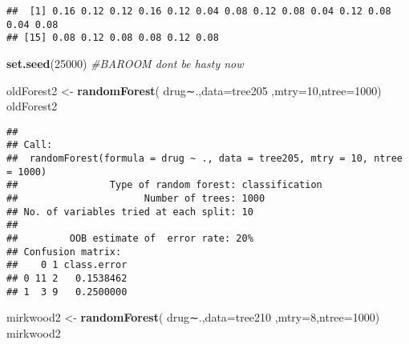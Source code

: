 \documentclass[]{article}
\newenvironment{Shaded}{\begin{snugshade}}{\end{snugshade}}
\newcommand{\KeywordTok}[1]{\textcolor[rgb]{0.13,0.29,0.53}{\textbf{#1}}}
\newcommand{\DataTypeTok}[1]{\textcolor[rgb]{0.13,0.29,0.53}{#1}}
\newcommand{\DecValTok}[1]{\textcolor[rgb]{0.00,0.00,0.81}{#1}}
\newcommand{\StringTok}[1]{\textcolor[rgb]{0.31,0.60,0.02}{#1}}
\newcommand{\CommentTok}[1]{\textcolor[rgb]{0.56,0.35,0.01}{\textit{#1}}}
\newcommand{\ControlFlowTok}[1]{\textcolor[rgb]{0.13,0.29,0.53}{\textbf{#1}}}
\newcommand{\OperatorTok}[1]{\textcolor[rgb]{0.81,0.36,0.00}{\textbf{#1}}}
\newcommand{\NormalTok}[1]{#1}
\begin{document}
\begin{Shaded}
\end{Shaded}

\begin{verbatim}
##  [1] 0.16 0.12 0.12 0.16 0.12 0.04 0.08 0.12 0.08 0.04 0.12 0.08 0.04 0.08
## [15] 0.08 0.12 0.08 0.08 0.12 0.08
\end{verbatim}

\begin{Shaded}
\begin{Highlighting}[]
\KeywordTok{set.seed}\NormalTok{(}\DecValTok{25000}\NormalTok{)}
\CommentTok{#BAROOM dont be hasty now}

\NormalTok{oldForest2 <-}\StringTok{ }\KeywordTok{randomForest}\NormalTok{( drug∼.,}\DataTypeTok{data=}\NormalTok{tree205  ,}\DataTypeTok{mtry=}\DecValTok{10}\NormalTok{,}\DataTypeTok{ntree=}\DecValTok{1000}\NormalTok{)}
\NormalTok{oldForest2}
\end{Highlighting}
\end{Shaded}

\begin{verbatim}
## 
## Call:
##  randomForest(formula = drug ~ ., data = tree205, mtry = 10, ntree = 1000) 
##                Type of random forest: classification
##                      Number of trees: 1000
## No. of variables tried at each split: 10
## 
##         OOB estimate of  error rate: 20%
## Confusion matrix:
##    0 1 class.error
## 0 11 2   0.1538462
## 1  3 9   0.2500000
\end{verbatim}

\begin{Shaded}
\begin{Highlighting}[]
\NormalTok{mirkwood2 <-}\StringTok{ }\KeywordTok{randomForest}\NormalTok{( drug∼.,}\DataTypeTok{data=}\NormalTok{tree210  ,}\DataTypeTok{mtry=}\DecValTok{8}\NormalTok{,}\DataTypeTok{ntree=}\DecValTok{1000}\NormalTok{)}
\NormalTok{mirkwood2}
\end{Highlighting}
\end{Shaded}
\end{document}
